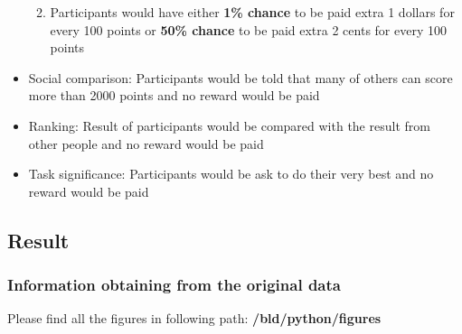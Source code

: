 \documentclass[11pt
]{article}
\begin{document}
\begin{itemize}
  \begin{enumerate}
  \def\labelenumi{\arabic{enumi}.}
  \item
    Participants would have either \textbf{1\% chance} to be paid extra
    1 dollars for every 100 points or \textbf{50\% chance} to be paid
    extra 2 cents for every 100 points
  \end{enumerate}
\item
  Social comparison: Participants would be told that many of others can
  score more than 2000 points and no reward would be paid
\item
  Ranking: Result of participants would be compared with the result from
  other people and no reward would be paid
\item
  Task significance: Participants would be ask to do their very best and
  no reward would be paid
\end{itemize}

\hypertarget{result}{%
\subsection{Result}\label{result}}

\hypertarget{information-obtaining-from-the-original-data}{%
\subsubsection{Information obtaining from the original
data}\label{information-obtaining-from-the-original-data}}

Please find all the figures in following path:
\textbf{/bld/python/figures}
\end{document}
